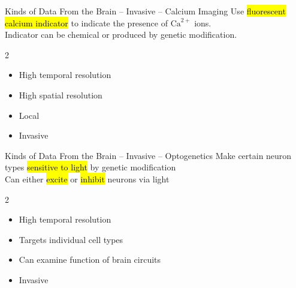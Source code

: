 \documentclass[handout,aspectratio=169]{beamer}
\begin{document}

\begin{frame}{Kinds of Data From the Brain -- Invasive -- Calcium Imaging}
	\vspace{0.5cm}
	Use \hl{fluorescent calcium indicator} to indicate the presence of $\mathrm{Ca}^{2+}$ ions.\\[0.125cm]
	Indicator can be chemical or produced by genetic modification.
	\begin{multicols}{2}
	\begin{itemize}
		\setlength\itemsep{0.25cm}
		\item[\OPlus] High temporal resolution
		\item[\OPlus] High spatial resolution
		\item[\OMinus] Local
		\item[\OMinus] Invasive
	\end{itemize}
	\end{multicols}
\end{frame}

\begin{frame}{Kinds of Data From the Brain -- Invasive -- Optogenetics}
	\vspace{0.5cm}
	Make certain neuron types \hl{sensitive to light} by genetic modification\\[0.25cm]
	Can either \hl{excite} or \hl{inhibit} neurons via light
	\begin{multicols}{2}
		\begin{itemize}
			\setlength\itemsep{0.25cm}
			\item[\OPlus] High temporal resolution
			\item[\OPlus] Targets individual cell types
			\item[\OPlus] Can examine function of brain circuits
		\end{itemize}
		\columnbreak
		\begin{itemize}
			\setlength\itemsep{0.25cm}
			\item[\OMinus] Invasive
		\end{itemize}
	\end{multicols}
\end{frame}

\end{document}
